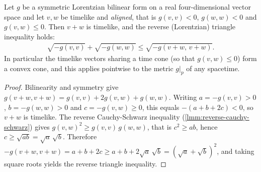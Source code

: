 \begin{lemma}
    \label{lmm:timelike-cone-convexity}
    \leanok
    Let $g$ be a symmetric Lorentzian bilinear form on a real four-dimensional vector space and let $v, w$ be timelike and \emph{aligned}, that is $g(v,v) < 0$, $g(w,w) < 0$ and $g(v,w) \le 0$. Then $v + w$ is timelike, and the reverse (Lorentzian) triangle inequality holds:
    \begin{align}
        \sqrt{-g(v,v)} + \sqrt{-g(w,w)} \le \sqrt{-g(v+w,\,v+w)}.
    \end{align}
    In particular the timelike vectors sharing a time cone (so that $g(v,w) \le 0$) form a convex cone, and this applies pointwise to the metric $g|_p$ of any spacetime.
\end{lemma}
\begin{proof}
    \leanok
    Bilinearity and symmetry give $g(v+w,v+w) = g(v,v) + 2g(v,w) + g(w,w)$. Writing $a = -g(v,v) > 0$, $b = -g(w,w) > 0$ and $c = -g(v,w) \ge 0$, this equals $-(a + b + 2c) < 0$, so $v+w$ is timelike. The reverse Cauchy-Schwarz inequality (\ref{lmm:reverse-cauchy-schwarz}) gives $g(v,w)^2 \ge g(v,v)\,g(w,w)$, that is $c^2 \ge ab$, hence $c \ge \sqrt{ab} = \sqrt a \,\sqrt b$. Therefore $-g(v+w,v+w) = a + b + 2c \ge a + b + 2\sqrt a\,\sqrt b = (\sqrt a + \sqrt b)^2$, and taking square roots yields the reverse triangle inequality.
\end{proof}

